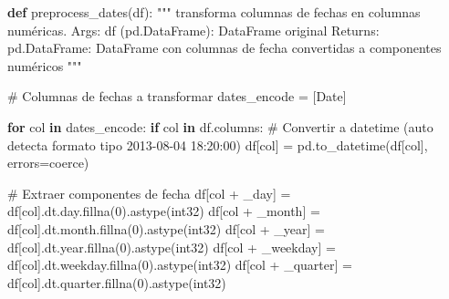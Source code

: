 \documentclass[
  letterpaper,
  DIV=11,
  numbers=noendperiod]{scrartcl}
\newenvironment{Shaded}{\begin{snugshade}}{\end{snugshade}}
\newcommand{\CommentTok}[1]{\textcolor[rgb]{0.37,0.37,0.37}{#1}}
\newcommand{\ControlFlowTok}[1]{\textcolor[rgb]{0.00,0.23,0.31}{\textbf{#1}}}
\newcommand{\DecValTok}[1]{\textcolor[rgb]{0.68,0.00,0.00}{#1}}
\newcommand{\KeywordTok}[1]{\textcolor[rgb]{0.00,0.23,0.31}{\textbf{#1}}}
\newcommand{\NormalTok}[1]{\textcolor[rgb]{0.00,0.23,0.31}{#1}}
\newcommand{\OperatorTok}[1]{\textcolor[rgb]{0.37,0.37,0.37}{#1}}
\newcommand{\StringTok}[1]{\textcolor[rgb]{0.13,0.47,0.30}{#1}}
\begin{document}
\begin{Shaded}
\begin{Highlighting}[]
\KeywordTok{def}\NormalTok{ preprocess\_dates(df):}
    \CommentTok{"""}
\CommentTok{     transforma columnas de fechas en columnas numéricas.}
\CommentTok{    }
\CommentTok{    Args:}
\CommentTok{        df (pd.DataFrame): DataFrame original}
\CommentTok{    }
\CommentTok{    Returns:}
\CommentTok{        pd.DataFrame: DataFrame con columnas de fecha convertidas a componentes numéricos}
\CommentTok{    """}
    
    \CommentTok{\# Columnas de fechas a transformar}
\NormalTok{    dates\_encode }\OperatorTok{=}\NormalTok{ [}\StringTok{\textquotesingle{}Date\textquotesingle{}}\NormalTok{]}
    
    \ControlFlowTok{for}\NormalTok{ col }\KeywordTok{in}\NormalTok{ dates\_encode:}
        \ControlFlowTok{if}\NormalTok{ col }\KeywordTok{in}\NormalTok{ df.columns:}
            \CommentTok{\# Convertir a datetime (auto detecta formato tipo 2013{-}08{-}04 18:20:00)}
\NormalTok{            df[col] }\OperatorTok{=}\NormalTok{ pd.to\_datetime(df[col], errors}\OperatorTok{=}\StringTok{\textquotesingle{}coerce\textquotesingle{}}\NormalTok{)}
            
            \CommentTok{\# Extraer componentes de fecha}
\NormalTok{            df[col }\OperatorTok{+} \StringTok{\textquotesingle{}\_day\textquotesingle{}}\NormalTok{]      }\OperatorTok{=}\NormalTok{ df[col].dt.day.fillna(}\DecValTok{0}\NormalTok{).astype(}\StringTok{\textquotesingle{}int32\textquotesingle{}}\NormalTok{)}
\NormalTok{            df[col }\OperatorTok{+} \StringTok{\textquotesingle{}\_month\textquotesingle{}}\NormalTok{]    }\OperatorTok{=}\NormalTok{ df[col].dt.month.fillna(}\DecValTok{0}\NormalTok{).astype(}\StringTok{\textquotesingle{}int32\textquotesingle{}}\NormalTok{)}
\NormalTok{            df[col }\OperatorTok{+} \StringTok{\textquotesingle{}\_year\textquotesingle{}}\NormalTok{]     }\OperatorTok{=}\NormalTok{ df[col].dt.year.fillna(}\DecValTok{0}\NormalTok{).astype(}\StringTok{\textquotesingle{}int32\textquotesingle{}}\NormalTok{)}
\NormalTok{            df[col }\OperatorTok{+} \StringTok{\textquotesingle{}\_weekday\textquotesingle{}}\NormalTok{]  }\OperatorTok{=}\NormalTok{ df[col].dt.weekday.fillna(}\DecValTok{0}\NormalTok{).astype(}\StringTok{\textquotesingle{}int32\textquotesingle{}}\NormalTok{)}
\NormalTok{            df[col }\OperatorTok{+} \StringTok{\textquotesingle{}\_quarter\textquotesingle{}}\NormalTok{]  }\OperatorTok{=}\NormalTok{ df[col].dt.quarter.fillna(}\DecValTok{0}\NormalTok{).astype(}\StringTok{\textquotesingle{}int32\textquotesingle{}}\NormalTok{)}
            

\end{Highlighting}
\end{Shaded}
\end{document}
